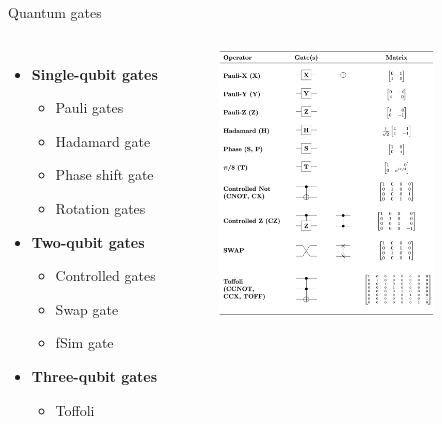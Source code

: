 \documentclass[aspectratio=169, 8pt, xcolor={svgnames}, hyperref={linkcolor=black}]{beamer}
\begin{document}
\begin{frame}{Quantum gates}

   \begin{columns}

     \column{6cm}
     \begin{itemize}
       \item {\bf Single-qubit gates}
       \begin{itemize}
         \item Pauli gates
         \item Hadamard gate
         \item Phase shift gate
         \item Rotation gates
       \end{itemize}
       \item {\bf Two-qubit gates}
       \begin{itemize}
         \item Controlled gates
         \item Swap gate
         \item fSim gate
       \end{itemize}
       \item \textbf{Three-qubit gates}
       \begin{itemize}
         \item Toffoli
       \end{itemize}
     \end{itemize}

     \column{6cm}
     \begin{figure}
       \includegraphics[height=7cm]{figures/Quantum_Logic_Gates.png}
     \end{figure}

   \end{columns}

 \end{frame}
\end{document}

